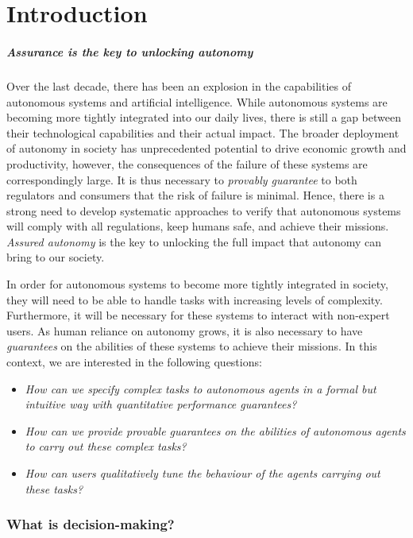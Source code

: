 \chapter{Introduction}

\paragraph{Assurance is the key to unlocking autonomy} Over the last decade, there has been an explosion in the capabilities of autonomous systems and artificial intelligence. While autonomous systems are becoming more tightly integrated into our daily lives, there is still a gap between their technological capabilities and their actual impact. The broader deployment of autonomy in society has unprecedented potential to drive economic growth and productivity, however, the consequences of the failure of these systems are correspondingly large. It is thus necessary to \emph{provably guarantee} to both regulators and consumers that the risk of failure is minimal. Hence, there is a strong need to develop systematic approaches to verify that autonomous systems will comply with all regulations, keep humans safe, and achieve their missions. \emph{Assured autonomy} is the key to unlocking the full impact that autonomy can bring to our society. 

In order for autonomous systems to become more tightly integrated in society, they will need to be able to handle tasks with increasing levels of complexity. Furthermore, it will be necessary for these systems to interact with non-expert users. As human reliance on autonomy grows, it is also necessary to have \emph{guarantees} on the abilities of these systems to achieve their missions. In this context, we are interested in the following questions:
\begin{itemize}
	\item \emph{How can we specify complex tasks to autonomous agents in a formal but intuitive way with quantitative performance guarantees?}
	\item \emph{How can we provide provable guarantees on the abilities of autonomous agents to carry out these complex tasks?}
	\item \emph{How can users qualitatively tune the behaviour of the agents carrying out these tasks?}
\end{itemize}

\subsection{What is decision-making?}

